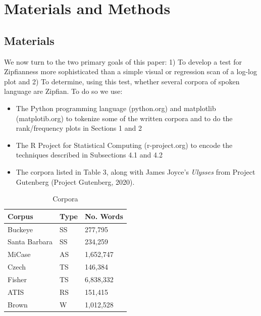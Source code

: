 \documentclass[12pt]{article}
\begin{document}
\section{Materials and Methods}
\subsection{Materials}
We now turn to the two primary goals of this paper: 1) To develop a test for Zipfianness more sophisticated than a simple visual or regression scan of a log-log plot and 2) To determine, using this test, whether several corpora of spoken language are Zipfian.   To do so we use:
\begin{itemize}
    \item The Python programming language (python.org) and matplotlib (matplotib.org) to tokenize some of the written corpora and to do the rank/frequency plots in Sections 1 and 2
    \item The R Project for Statistical Computing (r-project.org) to encode the techniques described in Subsections 4.1 and 4.2
    \item The corpora listed in Table 3, along with James Joyce's \emph{Ulysses} from Project Gutenberg (Project Gutenberg, 2020). 
\end{itemize}

\begin{table}[h!]
\begin{center}
 \begin{tabular}{||l l l || }
 \hline
 Corpus &  Type  & No. Words \\
 \hline
 Buckeye & SS & 277,795 \\ 
 Santa Barbara & SS & 234,259 \\
 MiCase & AS & 1,652,747 \\
 Czech & TS & 146,384 \\
 Fisher & TS & 6,838,332 \\ 
 ATIS   & RS & 151,415 \\
 Brown & W & 1,012,528 \\
\hline
\end{tabular}
\caption{Corpora}
\end{center}                                                                                                                                                                                                                                                                                                                                                                                                                                                                                  
\end{table}
\end{document}
